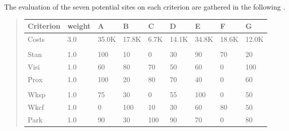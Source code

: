 \documentclass[a4paper,12pt,english]{sphinxhowto}
\begin{document}
The evaluation of the seven potential sites on each criterion are gathered in the following .
\begin{quote}


\begin{savenotes}\sphinxattablestart
\centering
\begin{tabulary}{\linewidth}[t]{|T|T|T|T|T|T|T|T|T|}
\hline
\sphinxstyletheadfamily 
Criterion
&\sphinxstyletheadfamily 
weight
&\sphinxstyletheadfamily 
A
&\sphinxstyletheadfamily 
B
&\sphinxstyletheadfamily 
C
&\sphinxstyletheadfamily 
D
&\sphinxstyletheadfamily 
E
&\sphinxstyletheadfamily 
F
&\sphinxstyletheadfamily 
G
\\
\hline
Costs
&
3.0
&
35.0K\texteuro{}
&
17.8K\texteuro{}
&
6.7K\texteuro{}
&
14.1K\texteuro{}
&
34.8K\texteuro{}
&
18.6K\texteuro{}
&
12.0K\texteuro{}
\\
\hline

&

&

&

&

&

&

&

&

\\
\hline
Stan
&
1.0
&
100
&
10
&
0
&
30
&
90
&
70
&
20
\\
\hline
Visi
&
1.0
&
60
&
80
&
70
&
50
&
60
&
0
&
100
\\
\hline
Prox
&
1.0
&
100
&
20
&
80
&
70
&
40
&
0
&
60
\\
\hline

&

&

&

&

&

&

&

&

\\
\hline
Wksp
&
1.0
&
75
&
30
&
0
&
55
&
100
&
0
&
50
\\
\hline
Wkcf
&
1.0
&
0
&
100
&
10
&
30
&
60
&
80
&
50
\\
\hline
Park
&
1.0
&
90
&
30
&
100
&
90
&
70
&
0
&
80
\\
\hline
\end{tabulary}
\par
\sphinxattableend\end{savenotes}
\end{quote}
\end{document}
